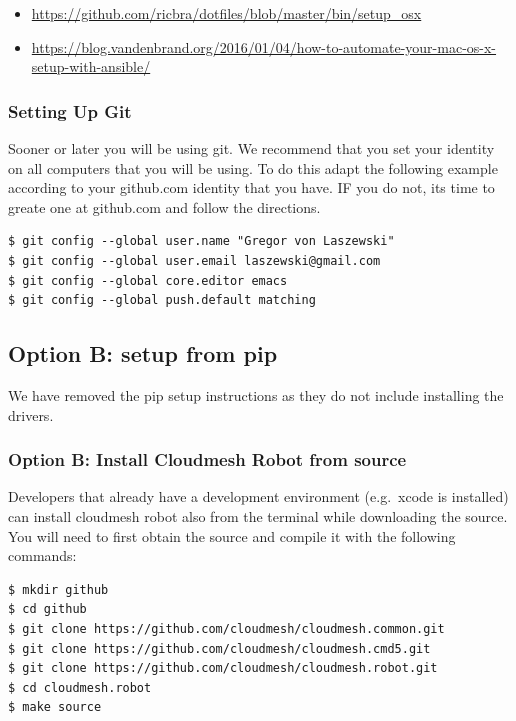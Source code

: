 \begin{itemize}
\item
  \url{https://github.com/ricbra/dotfiles/blob/master/bin/setup_osx}
\item
  \url{https://blog.vandenbrand.org/2016/01/04/how-to-automate-your-mac-os-x-setup-with-ansible/}
\end{itemize}

\subsubsection{Setting Up Git}\label{setting-up-git}

Sooner or later you will be using git. We recommend that you set your
identity on all computers that you will be using. To do this adapt the
following example according to your github.com identity that you have.
IF you do not, its time to greate one at github.com and follow the
directions.

\begin{verbatim}
$ git config --global user.name "Gregor von Laszewski"
$ git config --global user.email laszewski@gmail.com
$ git config --global core.editor emacs
$ git config --global push.default matching
\end{verbatim}

\subsection{Option B: setup from pip}\label{option-b-setup-from-pip}

We have removed the pip setup instructions as they do not include
installing the drivers.

\subsubsection{Option B: Install Cloudmesh Robot from
source}\label{option-b-install-cloudmesh-robot-from-source}

Developers that already have a development environment (e.g.~xcode is
installed) can install cloudmesh robot also from the terminal while
downloading the source. You will need to first obtain the source and
compile it with the following commands:

\begin{verbatim}
$ mkdir github
$ cd github
$ git clone https://github.com/cloudmesh/cloudmesh.common.git
$ git clone https://github.com/cloudmesh/cloudmesh.cmd5.git
$ git clone https://github.com/cloudmesh/cloudmesh.robot.git
$ cd cloudmesh.robot
$ make source
\end{verbatim}

